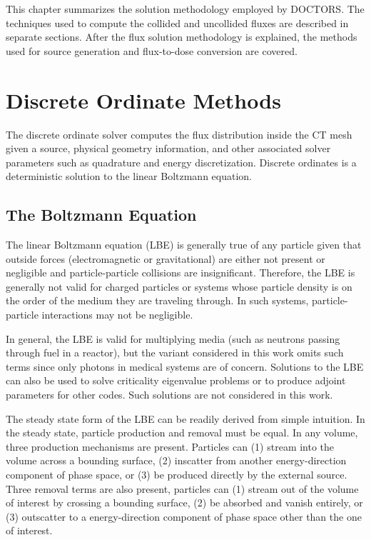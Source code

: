 
This chapter summarizes the solution methodology employed by DOCTORS. The techniques used to compute the collided and uncollided fluxes are described in separate sections. After the flux solution methodology is explained, the methods used for source generation and flux-to-dose conversion are covered.

\section{Discrete Ordinate Methods}

The discrete ordinate solver computes the flux distribution inside the CT mesh given a source, physical geometry information, and other associated solver parameters such as quadrature and energy discretization. Discrete ordinates is a deterministic solution to the linear Boltzmann equation.

\subsection{The Boltzmann Equation}

The linear Boltzmann equation (LBE) is generally true of any particle given that outside forces (electromagnetic or gravitational) are either not present or negligible and particle-particle collisions are insignificant. Therefore, the LBE is generally not valid for charged particles or systems whose particle density is on the order of the medium they are traveling through. In such systems, particle-particle interactions may not be negligible.  

In general, the LBE is valid for multiplying media (such as neutrons passing through fuel in a reactor), but the variant considered in this work omits such terms since only photons in medical systems are of concern. Solutions to the LBE can also be used to solve criticality eigenvalue problems or to produce adjoint parameters for other codes. Such solutions are not considered in this work.

The steady state form of the LBE can be readily derived from simple intuition. In the steady state, particle production and removal must be equal. In any volume, three production mechanisms are present. Particles can (1) stream into the volume across a bounding surface, (2) inscatter from another energy-direction component of phase space, or (3) be produced directly by the external source. Three removal terms are also present, particles can (1) stream out of the volume of interest by crossing a bounding surface, (2) be absorbed and vanish entirely, or (3) outscatter to a energy-direction component of phase space other than the one of interest.

